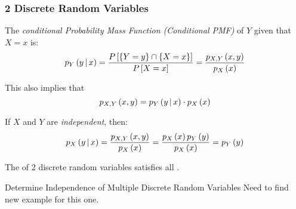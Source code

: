 \subsubsection{2 Discrete Random Variables}\label{subsubsec:2 Discrete Random Variables}
\begin{definition}\label{def:2 Discrete-Conditional PMF}
  The \emph{conditional Probability Mass Function (Conditional PMF)} of $Y$ given that $X=x$ is:
  \begin{equation}\label{eq:2 Discrete-Conditional PMF}
    p_{Y} \left( y \operatorname{\vert} x \right)
    = \frac{P \left[ \lbrace Y=y \rbrace \cap \lbrace X=x \rbrace \right]}{P \left[ X=x \right]}
    = \frac{p_{X,Y} \left( x,y \right)}{p_{X} \left( x \right)}
  \end{equation}
  \begin{remark}
    This also implies that
    \begin{equation}\label{eq:2 Discrete-Joint PMF}
      p_{X,Y} \left( x,y \right) = p_{Y} \left( y \operatorname{\vert} x \right) \cdot p_{X} \left( x \right)
    \end{equation}
  \end{remark}
  \begin{remark}
    If $X$ and $Y$ are \emph{independent}, then:
    \begin{equation}\label{eq:2 Discrete-Independent Conditional PMF}
      p_{X} \left( y \operatorname{\vert} x \right)
      = \frac{p_{X,Y} \left( x,y \right)}{p_{X} \left( x \right)}
      = \frac{p_{X} \left( x \right) p_{Y} \left( y \right)}{p_{X} \left( x \right)}
      = p_{Y} \left( y \right)
    \end{equation}
  \end{remark}
  \begin{remark}
    The  of 2 discrete random variables satisfies all .
  \end{remark}
\end{definition}
\begin{example}[Problem 5.75]{Determine Independence of Multiple Discrete Random Variables}
  Need to find new example for this one.
\end{example}

